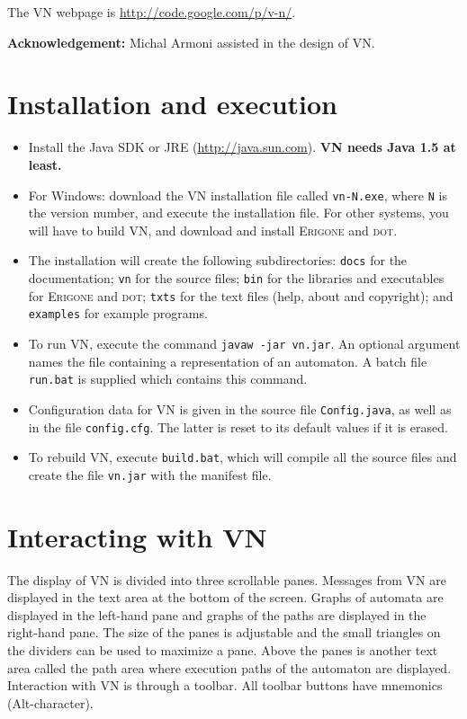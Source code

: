 \documentclass[11pt]{article}
\newcommand{\vn}{\textsc{VN}}
\newcommand{\dt}{\textsc{dot}}
\newcommand{\erg}{\textsc{Erigone}}
\newcommand{\p}[1]{\texttt{#1}}
\begin{document}
The \vn{} webpage is \url{http://code.google.com/p/v-n/}.

\textbf{Acknowledgement:} Michal Armoni assisted in the design of \vn{}.

\section{Installation and execution}

\begin{itemize}
\item Install the Java SDK or JRE (\url{http://java.sun.com}).
\textbf{\vn{} needs Java 1.5 at least.}

\item For Windows: download the \vn{} installation file called \p{vn-N.exe},
where \p{N} is the version number, and execute the installation file.
For other systems, you will have to build \vn{}, and download and install
\erg{} and \dt{}.

\item The installation will create the following subdirectories: \p{docs} for the
documentation; \p{vn} for the source files; \p{bin} for the libraries and executables
for \erg{} and \dt{}; \p{txts} for the text files
(help, about and copyright); and \p{examples} for example programs.

\item To run \vn{}, execute the command \p{javaw -jar vn.jar}. An
optional argument names the file containing a representation of an
automaton. A batch file \p{run.bat} is supplied which contains this
command.

\item Configuration data for \vn{} is given in the source file \p{Config.java}, 
as well as in the file \p{config.cfg}. The latter is reset to its default values
if it is erased.

\item To rebuild \vn{}, execute \p{build.bat}, which will compile all the source
files and create the file \p{vn.jar} with the manifest file.
\end{itemize}

\section{Interacting with \vn{}}

The display of \vn{} is divided into three scrollable panes. Messages
from \vn{} are displayed in the text area at the bottom of the screen.
Graphs of automata are displayed in the left-hand pane and graphs of the
paths are displayed in the right-hand pane. The size of the panes is
adjustable and the small triangles on the dividers can be used to
maximize a pane. Above the panes is another text area called the path
area where execution paths of the automaton are displayed. Interaction
with VN is through a toolbar. All toolbar buttons have mnemonics
(Alt-character).
\end{document}
